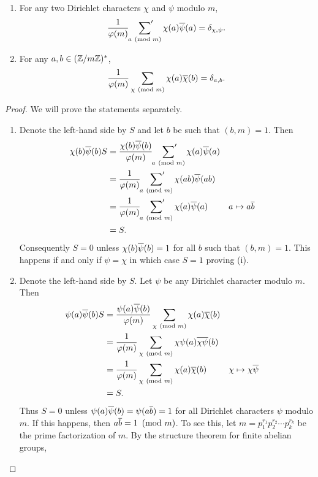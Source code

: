    \begin{proposition*}
    \phantom{ }
      \begin{enumerate}[label=(\roman*)]
        \item For any two Dirichlet characters $\chi$ and $\psi$ modulo $m$,
        \[
          \frac{1}{\varphi(m)}\sideset{}{'}\sum_{a \ \left(\text{mod }m\right)}\chi(a)\overline{\psi}(a) = \delta_{\chi,\psi}.
        \]
        \item For any $a,b \in (\mathbb{Z}/m\mathbb{Z})^{\ast}$,
        \[
          \frac{1}{\varphi(m)}\sum_{\chi \ \left(\text{mod }m\right)}\chi(a)\overline{\chi}(b) = \delta_{a,b}.
        \]
      \end{enumerate}
    \end{proposition*}
    \begin{proof}
      We will prove the statements separately.
      \begin{enumerate}[label=(\roman*)]
        \item Denote the left-hand side by $S$ and let $b$ be such that $(b,m) = 1$. Then
        \begin{align*}
          \chi(b)\overline{\psi}(b)S &= \frac{\chi(b)\overline{\psi}(b)}{\varphi(m)}\sideset{}{'}\sum_{a \ \left(\text{mod }m\right)}\chi(a)\overline{\psi}(a) \\
          &= \frac{1}{\varphi(m)}\sideset{}{'}\sum_{a \ \left(\text{mod }m\right)}\chi(ab)\overline{\psi}(ab) \\
          &= \frac{1}{\varphi(m)}\sideset{}{'}\sum_{a \ \left(\text{mod }m\right)}\chi(a)\overline{\psi}(a) && \text{$a \mapsto a\overline{b}$} \\
          &= S.
        \end{align*}
        Consequently $S = 0$ unless $\chi(b)\overline{\psi}(b) = 1$ for all $b$ such that $(b,m) = 1$. This happens if and only if $\psi = \chi$ in which case $S = 1$ proving (i).
        \item Denote the left-hand side by $S$. Let $\psi$ be any Dirichlet character modulo $m$. Then
        \begin{align*}
          \psi(a)\overline{\psi}(b)S &= \frac{\psi(a)\overline{\psi}(b)}{\varphi(m)}\sum_{\chi \ \left(\text{mod }m\right)}\chi(a)\overline{\chi}(b) \\
          &= \frac{1}{\varphi(m)}\sum_{\chi \ \left(\text{mod }m\right)}\chi\psi(a)\overline{\chi\psi}(b) \\
          &= \frac{1}{\varphi(m)}\sum_{\chi \ \left(\text{mod }m\right)}\chi(a)\overline{\chi}(b) && \text{$\chi \mapsto \chi\overline{\psi}$} \\
          &= S.
        \end{align*}
        Thus $S = 0$ unless $\psi(a)\overline{\psi}(b) = \psi(a\overline{b}) = 1$ for all Dirichlet characters $\psi$ modulo $m$. If this happens, then $a\overline{b} = 1 \ \left(\text{mod }m\right)$. To see this, let $m = p_{1}^{r_{1}}p_{2}^{r_{2}} \cdots p_{k}^{r_{k}}$ be the prime factorization of $m$. By the structure theorem for finite abelian groups,

\end{enumerate}
\end{proof}
